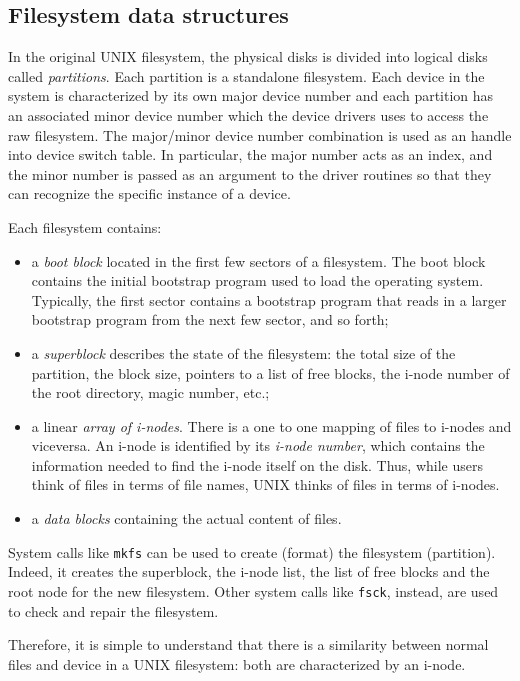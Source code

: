 \subsection{Filesystem data structures}
In the original UNIX filesystem, the physical disks is divided into logical disks called \emph{partitions}. Each partition is a standalone filesystem. Each device in the system is characterized by its own major device number and each partition has an associated minor device number which the device drivers uses to access the raw filesystem. The major/minor device number combination is used as an handle into device switch table. In particular, the major number acts as an index, and the minor number is passed as an argument to the driver routines so that they can recognize the specific instance of a device.

Each filesystem contains:
\begin{itemize}
\item a \emph{boot block} located in the first few sectors of a filesystem. The boot block contains the initial bootstrap program used to load the operating system. Typically, the first sector contains a bootstrap program that reads in a larger bootstrap program from the next few sector, and so forth;
\item a \emph{superblock} describes the state of the filesystem: the total size of the partition, the block size, pointers to a list of free blocks, the i-node number of the root directory, magic number, etc.;
\item a linear \emph{array of i-nodes}. There is a one to one mapping of files to i-nodes and viceversa. An i-node is identified by its \emph{i-node number}, which  contains the information needed to find the i-node itself on the disk. Thus, while users think of files in terms of file names, UNIX thinks of files in terms of i-nodes.
\item a \emph{data blocks} containing the actual content of files.
\end{itemize}

System calls like \texttt{mkfs} can be used to create (format) the filesystem (partition). Indeed, it creates the superblock, the i-node list, the list of free blocks and the root node for the new filesystem. Other system calls like \texttt{fsck}, instead, are used to check and repair the filesystem.

Therefore, it is simple to understand that there is a similarity between normal files and device in a UNIX filesystem: both are characterized by an i-node.

